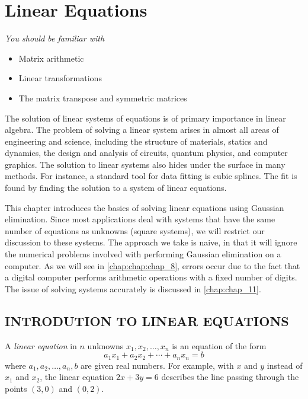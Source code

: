 \documentclass[../main.tex]{subfiles}
\begin{document}
\chapter{Linear Equations}
\label{chap:chap_2}
\emph{You should be familiar with}
\begin{itemize}[noitemsep]
	\item Matrix arithmetic
	\item Linear transformations
	\item The matrix transpose and symmetric matrices
\end{itemize}

The solution of linear systems of equations is of primary importance in linear algebra. The problem of solving a linear system arises in almost all areas of engineering and science, including the structure of materials, statics and dynamics, the design and analysis of circuits, quantum physics, and computer graphics. The solution to linear systems also hides under the surface in many methods. For instance, a standard tool for data fitting is cubic splines. The fit is found by finding the solution to a system of linear equations.

This chapter introduces the basics of solving linear equations using Gaussian elimination. Since most applications deal with systems that have the same number of equations as unknowns (square systems), we will restrict our discussion to these systems. The approach we take is naive, in that it will ignore the numerical problems involved with performing Gaussian elimination on a computer. As we will see in \autoref{chap:chap:chap_8}, errors occur due to the fact that a digital computer performs arithmetic operations with a fixed number of digits. The issue of solving systems accurately is discussed in \autoref{chap:chap_11}.

\section[Introduction to Linear Equations]{INTRODUTION TO LINEAR EQUATIONS}

A \emph{linear equation} in $n$ unknowns $x_{1}, x_{2}, \ldots, x_{n}$ is an equation of the form
$$
a_{1} x_{1}+a_{2} x_{2}+\cdots+a_{n} x_{n}=b
$$
where $a_{1}, a_{2}, \ldots, a_{n}, b$ are given real numbers. For example, with $x$ and $y$ instead of $x_{1}$ and $x_{2}$, the linear equation $2 x+3 y=6$ describes the line passing through the points $(3,0)$ and $(0,2)$.
\end{document}
